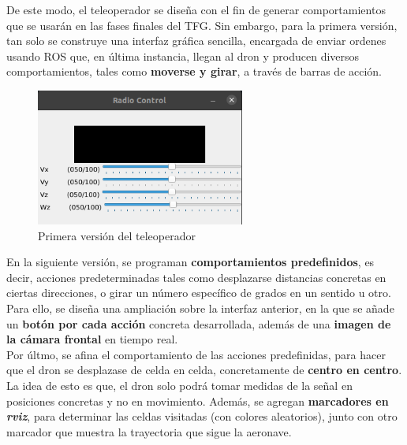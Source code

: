 De este modo, el teleoperador se diseña con el fin de generar comportamientos que se usarán en las fases finales del \ac{TFG}. Sin embargo, para la primera versión, tan solo se construye una interfaz gráfica sencilla, encargada de enviar ordenes usando \ac{ROS} que, en última instancia, llegan al dron y producen diversos comportamientos, tales como \textbf{moverse y girar}, a través de barras de acción.\\

\begin{figure} [H]
	\begin{center}
	\includegraphics[height=4.5cm]{imagenes/cap4/2_axes_rc.png}
	\end{center}
	\caption[Primera versión del teleoperador]{Primera versión del teleoperador}
	\label{fig:teleoperador_v1}
\end{figure}

En la siguiente versión, se programan \textbf{comportamientos predefinidos}, es decir, acciones predeterminadas tales como desplazarse distancias concretas en ciertas direcciones, o girar un número específico de grados en un sentido u otro. Para ello, se diseña una ampliación sobre la interfaz anterior, en la que se añade un \textbf{botón por cada acción} concreta desarrollada, además de una \textbf{imagen de la cámara frontal} en tiempo real.\\

Por últmo, se afina el comportamiento de las acciones predefinidas, para hacer que el dron se desplazase de celda en celda, concretamente de \textbf{centro en centro}. La idea de esto es que, el dron solo podrá tomar medidas de la señal en posiciones concretas y no en movimiento. Además, se agregan \textbf{marcadores en \emph{rviz}}, para determinar las celdas visitadas (con colores aleatorios), junto con otro marcador que muestra la trayectoria que sigue la aeronave.\\

